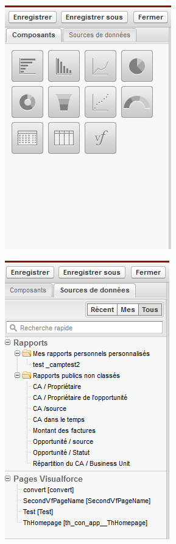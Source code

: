 \documentclass[a4paper, 12pt]{report}
\begin{document}
\begin{itemize}
\begin{figure}[H]
	\centering
		\includegraphics{composantsTB1.PNG}
	\label{fig:composantsTB1}
\end{figure}
\begin{figure}[H]
	\centering
		\includegraphics{composantsTB2.PNG}
	\label{fig:composantsTB1}
\end{figure}

\end{itemize}
\end{document}
